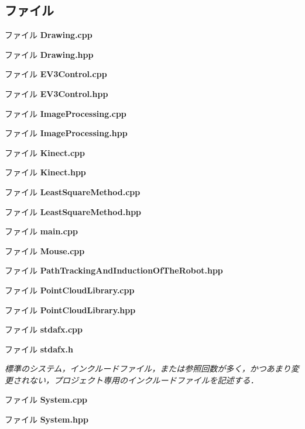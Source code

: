 \subsection*{ファイル}
\begin{DoxyCompactItemize}
\item 
ファイル {\bf Drawing.\-cpp}
\item 
ファイル {\bf Drawing.\-hpp}
\item 
ファイル {\bf E\-V3\-Control.\-cpp}
\item 
ファイル {\bf E\-V3\-Control.\-hpp}
\item 
ファイル {\bf Image\-Processing.\-cpp}
\item 
ファイル {\bf Image\-Processing.\-hpp}
\item 
ファイル {\bf Kinect.\-cpp}
\item 
ファイル {\bf Kinect.\-hpp}
\item 
ファイル {\bf Least\-Square\-Method.\-cpp}
\item 
ファイル {\bf Least\-Square\-Method.\-hpp}
\item 
ファイル {\bf main.\-cpp}
\item 
ファイル {\bf Mouse.\-cpp}
\item 
ファイル {\bf Path\-Tracking\-And\-Induction\-Of\-The\-Robot.\-hpp}
\item 
ファイル {\bf Point\-Cloud\-Library.\-cpp}
\item 
ファイル {\bf Point\-Cloud\-Library.\-hpp}
\item 
ファイル {\bf stdafx.\-cpp}
\item 
ファイル {\bf stdafx.\-h}
\begin{DoxyCompactList}\small\item\em 標準のシステム，インクルードファイル，または参照回数が多く，かつあまり変更されない，プロジェクト専用のインクルードファイルを記述する． \end{DoxyCompactList}\item 
ファイル {\bf System.\-cpp}
\item 
ファイル {\bf System.\-hpp}
\end{DoxyCompactItemize}
